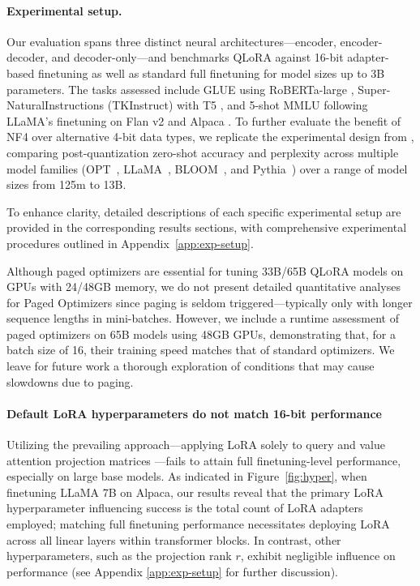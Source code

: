 \paragraph{Experimental setup.} Our evaluation spans three distinct neural architectures—encoder, encoder-decoder, and decoder-only—and benchmarks QLoRA against 16-bit adapter-based finetuning as well as standard full finetuning for model sizes up to 3B parameters. The tasks assessed include GLUE \citep{wang2018glue} using RoBERTa-large \citep{liu2019roberta}, Super-NaturalInstructions (TKInstruct) \citep{wang2022super} with T5 \citep{t5}, and 5-shot MMLU \citep{hendrycksmeasuring} following LLaMA’s finetuning on Flan v2 \citep{longpre2023flan} and Alpaca \citep{alpaca}. To further evaluate the benefit of NF4 over alternative 4-bit data types, we replicate the experimental design from \citet{dettmers2022case}, comparing post-quantization zero-shot accuracy and perplexity across multiple model families (OPT~\citep{zhang2022opt}, LLaMA~\citep{touvron2023llama}, BLOOM~\citep{scao2022bloom}, and Pythia~\citep{biderman2023pythia}) over a range of model sizes from 125m to 13B.

To enhance clarity, detailed descriptions of each specific experimental setup are provided in the corresponding results sections, with comprehensive experimental procedures outlined in Appendix~\ref{app:exp-setup}.

Although paged optimizers are essential for tuning 33B/65B \textsc{QLoRA} models on GPUs with 24/48GB memory, we do not present detailed quantitative analyses for Paged Optimizers since paging is seldom triggered—typically only with longer sequence lengths in mini-batches. However, we include a runtime assessment of paged optimizers on 65B models using 48GB GPUs, demonstrating that, for a batch size of 16, their training speed matches that of standard optimizers. We leave for future work a thorough exploration of conditions that may cause slowdowns due to paging.

\paragraph{Default LoRA hyperparameters do not match 16-bit performance} 

Utilizing the prevailing approach—applying LoRA solely to query and value attention projection matrices \citep{hu2021lora}—fails to attain full finetuning-level performance, especially on large base models. As indicated in Figure~\ref{fig:hyper}, when finetuning LLaMA 7B on Alpaca, our results reveal that the primary LoRA hyperparameter influencing success is the total count of LoRA adapters employed; matching full finetuning performance necessitates deploying LoRA across all linear layers within transformer blocks. In contrast, other hyperparameters, such as the projection rank $r$, exhibit negligible influence on performance (see Appendix \ref{app:exp-setup} for further discussion).

